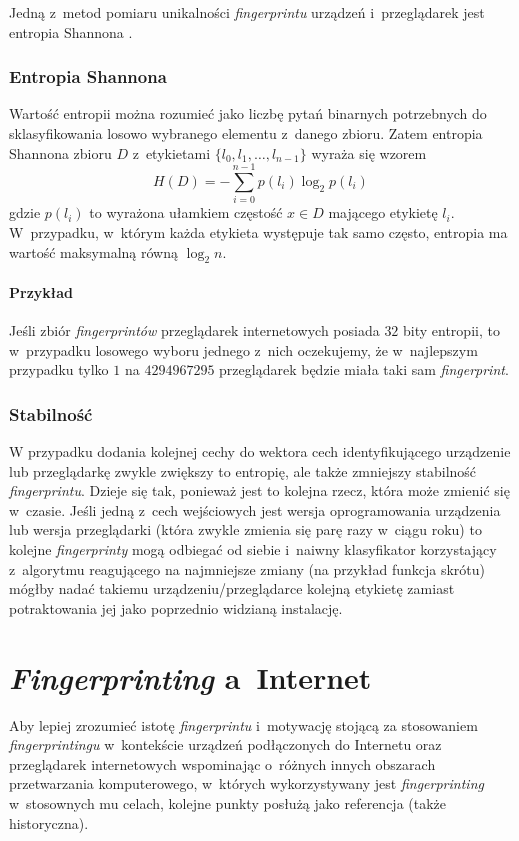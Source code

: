 Jedną z~metod pomiaru unikalności \emph{fingerprintu} urządzeń i~przeglądarek
jest entropia Shannona \cite[s. 6]{eckersley2010unique}.

\subsubsection{Entropia Shannona}
Wartość entropii można rozumieć jako liczbę pytań binarnych potrzebnych do
sklasyfikowania losowo wybranego elementu z~danego zbioru. Zatem entropia
Shannona zbioru \(D\) z~etykietami \(\{l_{0}, l_{1}, \dots, l_{n - 1}\}\) wyraża
się wzorem \[H(D) = -{\sum_{i = 0}^{n - 1}{p(l_{i})\log_{2}{p(l_{i})}}}\] gdzie
\(p(l_{i})\) to wyrażona ułamkiem częstość \(x \in D\) mającego etykietę
\(l_{i}\). W~przypadku, w~którym każda etykieta występuje tak samo często,
entropia ma wartość maksymalną równą \(\log_{2}{n}\).

\paragraph{Przykład}
Jeśli zbiór \emph{fingerprintów} przeglądarek internetowych posiada \(32\) bity
entropii, to w~przypadku losowego wyboru jednego z~nich oczekujemy, że
w~najlepszym przypadku tylko \(1\) na \(4294967295\) przeglądarek będzie miała
taki sam \emph{fingerprint}.

\subsubsection{Stabilność}
W przypadku dodania kolejnej cechy do wektora cech identyfikującego urządzenie
lub przeglądarkę zwykle zwiększy to entropię, ale także zmniejszy stabilność
\emph{fingerprintu}. Dzieje się tak, ponieważ jest to kolejna rzecz, która może
zmienić się w~czasie. Jeśli jedną z~cech wejściowych jest wersja oprogramowania
urządzenia lub wersja przeglądarki (która zwykle zmienia się parę razy w~ciągu
roku) to kolejne \emph{fingerprinty} mogą odbiegać od siebie i~naiwny
klasyfikator korzystający z~algorytmu reagującego na najmniejsze zmiany (na
przykład funkcja skrótu) mógłby nadać takiemu urządzeniu/przeglądarce kolejną
etykietę zamiast potraktowania jej jako poprzednio widzianą instalację.

\section{\emph{Fingerprinting} a~Internet} %
Aby lepiej zrozumieć istotę \emph{fingerprintu} i~motywację stojącą za
stosowaniem \emph{fingerprintingu} w~kontekście urządzeń podłączonych do
Internetu oraz przeglądarek internetowych wspominając o~różnych innych obszarach
przetwarzania komputerowego, w~których wykorzystywany jest \emph{fingerprinting}
w~stosownych mu celach, kolejne punkty posłużą jako referencja (także
historyczna).

